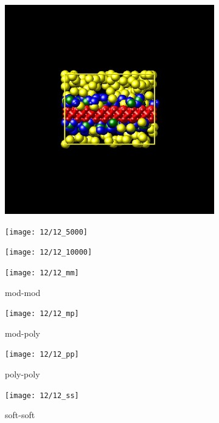 \documentclass[a4paper]{article}
\begin{document}
\begin{figure}[H]
\begin{subfigure}{0.3\textwidth}
  \centering
  \includegraphics[width=\linewidth,keepaspectratio]{start}
  \caption{}
\end{subfigure}
\begin{subfigure}{0.3\textwidth}
  \centering
  \texttt{[image: 12/12\_5000]}
  \caption{}
\end{subfigure}
\begin{subfigure}{0.3\textwidth}
  \centering
  \texttt{[image: 12/12\_10000]}
  \caption{}
\end{subfigure}
\caption{}
\label{fig_1}
\end{figure}

\begin{figure}[H]
\begin{subfigure}{0.24\textwidth}
  \centering
  \texttt{[image: 12/12\_mm]}
  \caption{mod-mod}
\end{subfigure}
\begin{subfigure}{0.24\textwidth}
  \centering
  \texttt{[image: 12/12\_mp]}
  \caption{mod-poly}
\end{subfigure}
\begin{subfigure}{0.24\textwidth}
  \centering
  \texttt{[image: 12/12\_pp]}
  \caption{poly-poly}
\end{subfigure}
\begin{subfigure}{0.24\textwidth}
  \centering
  \texttt{[image: 12/12\_ss]}
  \caption{soft-soft}
\end{subfigure}
\caption{}
\label{fig_1}
\end{figure}
\end{document}
